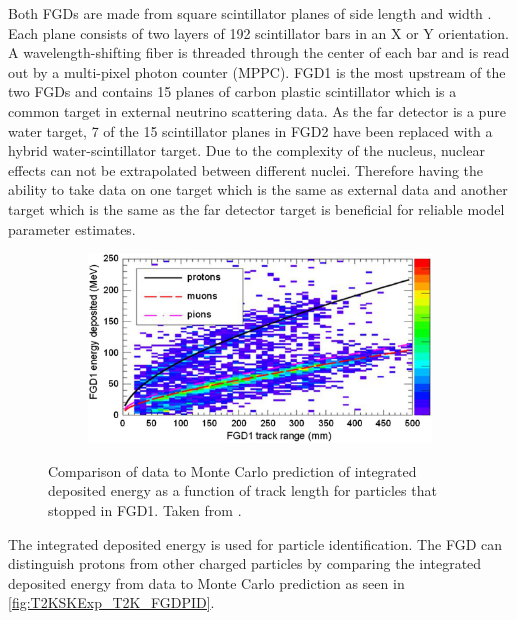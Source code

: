Both FGDs are made from square scintillator planes of side length  and width . Each plane consists of two layers of 192 scintillator bars in an X or Y orientation. A wavelength-shifting fiber is threaded through the center of each bar and is read out by a multi-pixel photon counter (MPPC). FGD1 is the most upstream of the two FGDs and contains 15 planes of carbon plastic scintillator which is a common target in external neutrino scattering data. As the far detector is a pure water target, 7 of the 15 scintillator planes in FGD2 have been replaced with a hybrid water-scintillator target. Due to the complexity of the nucleus, nuclear effects can not be extrapolated between different nuclei. Therefore having the ability to take data on one target which is the same as external data and another target which is the same as the far detector target is beneficial for reliable model parameter estimates.

\begin{figure}[h]
  \begin{subfigure}[t]{0.7\textwidth}
    \includegraphics[width=\textwidth, trim={0mm 0mm 0mm 0mm}, clip,page=1]{Figures/Detectors/T2KFGDPID.pdf}
  \end{subfigure}
  \caption{Comparison of data to Monte Carlo prediction of integrated deposited energy as a function of track length for particles that stopped in FGD1. Taken from \cite{Amaudruz2012}.}
  \label{fig:T2KSKExp_T2K_FGDPID}
\end{figure}

The integrated deposited energy is used for particle identification. The FGD can distinguish protons from other charged particles by comparing the integrated deposited energy from data to Monte Carlo prediction as seen in \autoref{fig:T2KSKExp_T2K_FGDPID}.

